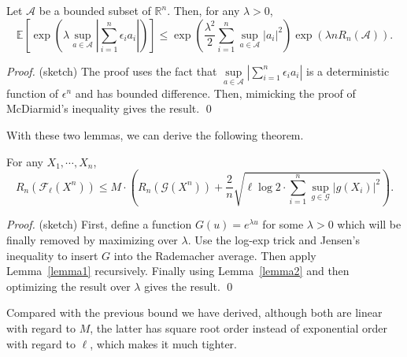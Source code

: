 \documentclass[12pt]{llncs}
\newcommand{\E}[1]{\mathbb{E}\left[#1\right]}
\newcommand{\F}{\mathcal{F}}
\newcommand{\reals}{\mathbb{R}}
\begin{document}
\begin{lemma}
  \label{lemma2}
  Let $\mathcal{A}$ be a bounded subset of $\reals^n$. Then, for any $\lambda > 0$, $$\E{\exp\left(\lambda \sup\limits_{a \in \mathcal{A}}\left|\sum_{i=1}^{n}\epsilon_i a_i\right|\right)} \leq \exp\left(\frac{\lambda^2}{2}\sum_{i=1}^{n}\sup\limits_{a \in \mathcal{A}}|a_i|^2\right)\exp\left(\lambda n R_n(\mathcal{A})\right).$$
\end{lemma}
\begin{proof}(sketch) The proof uses the fact that $\sup\limits_{a \in \mathcal{A}}\left|\sum_{i=1}^{n}\epsilon_i a_i\right|$ is a deterministic function of $\epsilon^n$ and has bounded difference. Then, mimicking the proof of McDiarmid's inequality gives the result. \qed
\end{proof}

With these two lemmas, we can derive the following theorem.
\begin{theorem}
  For any $X_1, \cdots, X_n$, $$R_n(\F_\ell(X^n)) \leq M \cdot \left(R_n(\mathcal{G}(X^n)) + \frac{2}{n}\sqrt{\ell \log 2 \cdot \sum_{i=1}^{n}\sup\limits_{g \in \mathcal{G}}|g(X_i)|^2}\right).$$
\end{theorem}
\begin{proof} (sketch) First, define a function $G(u) = e^{\lambda u}$ for some $\lambda > 0$ which will be finally removed by maximizing over $\lambda$. Use the log-exp trick and Jensen's inequality to insert $G$ into the Rademacher average. Then apply Lemma~\ref{lemma1} recursively. Finally using Lemma~\ref{lemma2} and then optimizing the result over $\lambda$ gives the result. \qed
\end{proof}

Compared with the previous bound we have derived, although both are linear with regard to $M$, the latter has square root order instead of exponential order with regard to $\ell$, which makes it much tighter.


\end{document}
